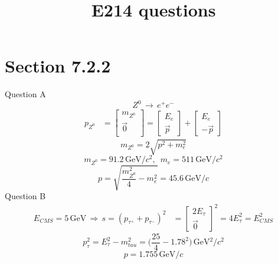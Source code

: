 \documentclass{article}
\title{E214 questions}
\begin{document}
\maketitle
\section{Section 7.2.2}
Question A
\begin{equation}
Z^0 \, \rightarrow \, e^+ e^-
\end{equation}
\begin{align}
p_{Z^0} &= \begin{bmatrix}
           m_{Z^0} \\
          \vec{0} \\
         \end{bmatrix} 
         =
         \begin{bmatrix}
         E_e\\
         \vec{p}
         \end{bmatrix}
         +
         \begin{bmatrix}
         E_e\\
         -\vec{p}
         \end{bmatrix}
\end{align}
\begin{equation}
m_{Z^0} = 2 \sqrt{p^2 + m_e^2}
\end{equation}
\begin{equation}
m_{Z^0} = 91.2 \, \text{GeV/$c^2$}, \hspace{6pt} m_{e} = 511 \, \text{GeV/$c^2$}
\end{equation}
\begin{equation}
p = \sqrt{\frac{m_{Z^0}^2}{4} - m_e^2} = 45.6 \, \text{GeV/$c$}
\end{equation}
Question B
\begin{align}
E_{CMS} = 5 \, \text{GeV} \, \Rightarrow \, s = (p_{\tau^+} + p_{\tau^-})^2 &= \begin{bmatrix}
2E_{\tau}\\
\vec{0}
\end{bmatrix}^2 = 4 E_{\tau}^2 = E_{CMS}^2
\end{align}
\begin{equation}
p_{\tau}^2 = E_{\tau}^2 - m_{tau}^2 = \Big( \frac{25}{4} - 1.78^2 \Big) \, \text{GeV$^2$/$c^2$}
\end{equation}
\begin{equation}
p = 1.755 \, \text{GeV/$c$}
\end{equation}
\end{document}
